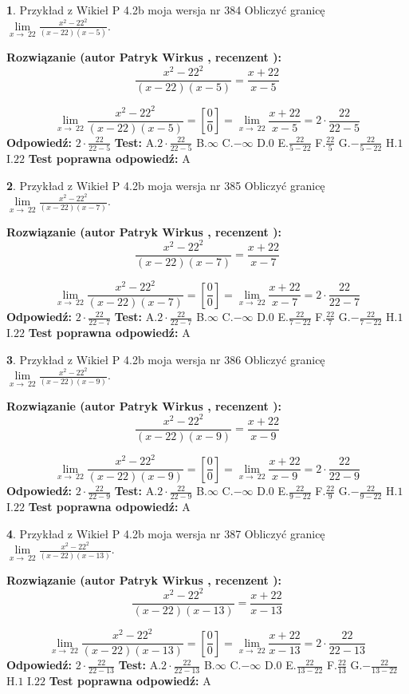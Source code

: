 \documentclass[12pt, a4paper]{article}
\theoremstyle{definition} %
\newtheorem{zad}{}
\newcommand{\zadStart}[1]{\begin{zad}#1\newline}
\newcommand{\zadStop}{\end{zad}}
\newcommand{\rozwStart}[2]{\noindent \textbf{Rozwiązanie (autor #1 , recenzent #2): }\newline}
\newcommand{\rozwStop}{\newline}
\newcommand{\odpStart}{\noindent \textbf{Odpowiedź:}\newline}
\newcommand{\odpStop}{\newline}
\newcommand{\testStart}{\noindent \textbf{Test:}\newline}
\newcommand{\testStop}{\newline}
\newcommand{\kluczStart}{\noindent \textbf{Test poprawna odpowiedź:}\newline}
\newcommand{\kluczStop}{\newline}
\begin{document}
\zadStart{Przykład z Wikieł P 4.2b moja wersja nr 384}
Obliczyć granicę $\lim\limits_{x\to\ 22}\frac{x^{2}-22^{2}}{(x-22)(x-5)}$.
\zadStop
\rozwStart{Patryk Wirkus}{}
$$\frac{x^{2}-22^{2}}{(x-22)(x-5)}=\frac{x+22}{x-5}$$

$$\lim\limits_{x\to\ 22}\frac{x^{2}-22^{2}}{(x-22)(x-5)}=[\frac{0}{0}]=\lim\limits_{x\to\ 22}\frac{x+22}{x-5}=2 \cdot \frac{22}{22-5}$$
\rozwStop
\odpStart
$2 \cdot \frac{22}{22-5}$
\odpStop
\testStart
A.$2 \cdot \frac{22}{22-5}$
B.$\infty$
C.$-\infty$
D.$0$
E.$\frac{22}{5-22}$
F.$\frac{22}{5}$
G.$-\frac{22}{5-22}$
H.$1$
I.$22$
\testStop
\kluczStart
A
\kluczStop



\zadStart{Przykład z Wikieł P 4.2b moja wersja nr 385}
Obliczyć granicę $\lim\limits_{x\to\ 22}\frac{x^{2}-22^{2}}{(x-22)(x-7)}$.
\zadStop
\rozwStart{Patryk Wirkus}{}
$$\frac{x^{2}-22^{2}}{(x-22)(x-7)}=\frac{x+22}{x-7}$$

$$\lim\limits_{x\to\ 22}\frac{x^{2}-22^{2}}{(x-22)(x-7)}=[\frac{0}{0}]=\lim\limits_{x\to\ 22}\frac{x+22}{x-7}=2 \cdot \frac{22}{22-7}$$
\rozwStop
\odpStart
$2 \cdot \frac{22}{22-7}$
\odpStop
\testStart
A.$2 \cdot \frac{22}{22-7}$
B.$\infty$
C.$-\infty$
D.$0$
E.$\frac{22}{7-22}$
F.$\frac{22}{7}$
G.$-\frac{22}{7-22}$
H.$1$
I.$22$
\testStop
\kluczStart
A
\kluczStop



\zadStart{Przykład z Wikieł P 4.2b moja wersja nr 386}
Obliczyć granicę $\lim\limits_{x\to\ 22}\frac{x^{2}-22^{2}}{(x-22)(x-9)}$.
\zadStop
\rozwStart{Patryk Wirkus}{}
$$\frac{x^{2}-22^{2}}{(x-22)(x-9)}=\frac{x+22}{x-9}$$

$$\lim\limits_{x\to\ 22}\frac{x^{2}-22^{2}}{(x-22)(x-9)}=[\frac{0}{0}]=\lim\limits_{x\to\ 22}\frac{x+22}{x-9}=2 \cdot \frac{22}{22-9}$$
\rozwStop
\odpStart
$2 \cdot \frac{22}{22-9}$
\odpStop
\testStart
A.$2 \cdot \frac{22}{22-9}$
B.$\infty$
C.$-\infty$
D.$0$
E.$\frac{22}{9-22}$
F.$\frac{22}{9}$
G.$-\frac{22}{9-22}$
H.$1$
I.$22$
\testStop
\kluczStart
A
\kluczStop



\zadStart{Przykład z Wikieł P 4.2b moja wersja nr 387}
Obliczyć granicę $\lim\limits_{x\to\ 22}\frac{x^{2}-22^{2}}{(x-22)(x-13)}$.
\zadStop
\rozwStart{Patryk Wirkus}{}
$$\frac{x^{2}-22^{2}}{(x-22)(x-13)}=\frac{x+22}{x-13}$$

$$\lim\limits_{x\to\ 22}\frac{x^{2}-22^{2}}{(x-22)(x-13)}=[\frac{0}{0}]=\lim\limits_{x\to\ 22}\frac{x+22}{x-13}=2 \cdot \frac{22}{22-13}$$
\rozwStop
\odpStart
$2 \cdot \frac{22}{22-13}$
\odpStop
\testStart
A.$2 \cdot \frac{22}{22-13}$
B.$\infty$
C.$-\infty$
D.$0$
E.$\frac{22}{13-22}$
F.$\frac{22}{13}$
G.$-\frac{22}{13-22}$
H.$1$
I.$22$
\testStop
\kluczStart
A
\kluczStop
\end{document}
